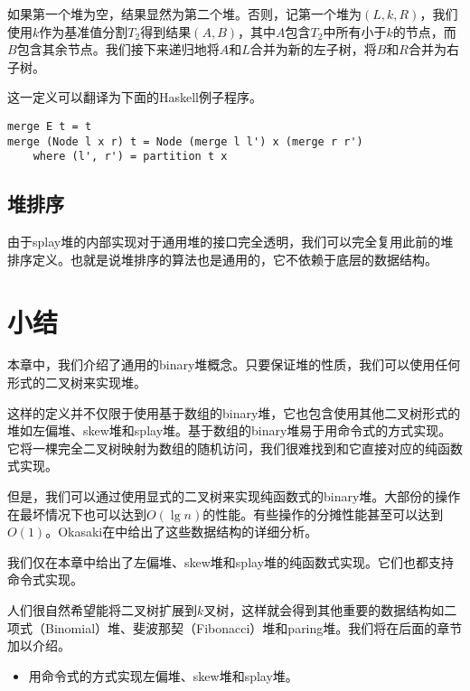 \documentclass[UTF8]{article}
\begin{document}
如果第一个堆为空，结果显然为第二个堆。否则，记第一个堆为$(L, k, R)$，我们使用$k$作为基准值分割$T_2$得到结果$(A, B)$，其中$A$包含$T_2$中所有小于$k$的节点，而$B$包含其余节点。我们接下来递归地将$A$和$L$合并为新的左子树，将$B$和$R$合并为右子树。

这一定义可以翻译为下面的Haskell例子程序。

\lstset{language=Haskell}
\begin{lstlisting}
merge E t = t
merge (Node l x r) t = Node (merge l l') x (merge r r')
    where (l', r') = partition t x
\end{lstlisting}

\subsection{堆排序}

由于splay堆的内部实现对于通用堆的接口完全透明，我们可以完全复用此前的堆排序定义。也就是说堆排序的算法也是通用的，它不依赖于底层的数据结构。

\section{小结}

本章中，我们介绍了通用的binary堆概念。只要保证堆的性质，我们可以使用任何形式的二叉树来实现堆。

这样的定义并不仅限于使用基于数组的binary堆，它也包含使用其他二叉树形式的堆如左偏堆、skew堆和splay堆。基于数组的binary堆易于用命令式的方式实现。它将一棵完全二叉树映射为数组的随机访问，我们很难找到和它直接对应的纯函数式实现。

但是，我们可以通过使用显式的二叉树来实现纯函数式的binary堆。大部份的操作在最坏情况下也可以达到$O(\lg n)$的性能。有些操作的分摊性能甚至可以达到$O(1)$。Okasaki在\cite{okasaki-book}中给出了这些数据结构的详细分析。

我们仅在本章中给出了左偏堆、skew堆和splay堆的纯函数式实现。它们也都支持命令式实现。

人们很自然希望能将二叉树扩展到$k$叉树，这样就会得到其他重要的数据结构如二项式（Binomial）堆、斐波那契（Fibonacci）堆和paring堆。我们将在后面的章节加以介绍。

\begin{Exercise}
\begin{itemize}
\item 用命令式的方式实现左偏堆、skew堆和splay堆。
\end{itemize}
\end{Exercise}
\end{document}
